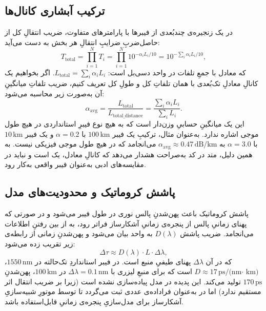 \subsection{ترکیب آبشاری کانال‌ها}

در یک زنجیره‌ی چندبُعدی از فیبرها با پارامترهای متفاوت، ضریب انتقالِ کل از حاصل‌ضربِ ضرایبِ انتقالِ هر بخش به دست می‌آید:
\begin{equation}
	T_{\text{total}} = \prod_{i=1}^{N} T_i = \prod_{i=1}^{N} 10^{-\alpha_i L_i / 10} = 10^{-\sum_i \alpha_i L_i / 10},
	\label{eq:cascade-product}
\end{equation}
که معادل با جمعِ تلفات در واحد دسی‌بل است: $L_{\text{total}} = \sum_i \alpha_i L_i$. اگر بخواهیم یک کانالِ معادلِ تک‌بُعدی با همان تلفاتِ کل و طولِ کل تعریف کنیم، ضریب تلفاتِ میانگینِ آن به‌صورت زیر محاسبه می‌شود:
\begin{equation}
	\alpha_{\text{avg}} = \frac{L_{\text{total}}}{L_{\text{total\_distance}}} = \frac{\sum_i \alpha_i L_i}{\sum_i L_i}.
	\label{eq:cascade-alpha-avg}
\end{equation}
این یک میانگینِ حسابیِ وزن‌دار است که به هیچ نوع فیبرِ استانداردی در هیچ طول موجی اشاره ندارد. به‌عنوان مثال، ترکیبِ یک فیبر $100\,\text{km}$ با $\alpha = 0.2$ و یک فیبر $10\,\text{km}$ با $\alpha = 3.0$ به $\alpha_{\text{avg}} \approx 0.47\,\text{dB/km}$ می‌انجامد که در هیچ طول موجی فیزیکی نیست. به همین دلیل، متد  در کد به‌صراحت هشدار می‌دهد که کانالِ معادل، یک  است و نباید در مقایسه‌های ادبی به‌عنوان فیبر واقعی به‌کار رود.

\subsection{پاشش کروماتیک و محدودیت‌های مدل}

پاشش کروماتیک  باعث پهن‌شدنِ پالس نوری در طول فیبر می‌شود و در صورتی که پهنای زمانیِ پالس از پنجره‌ی زمانیِ آشکارساز فراتر رود، به از بین رفتنِ اطلاعات می‌انجامد. ضریب پاشش $D(\lambda)$ به واحد  بیان می‌شود و پهن‌شدنِ زمانی از رابطه‌ی زیر تقریب زده می‌شود:
\begin{equation}
	\Delta\tau \approx D(\lambda) \cdot L \cdot \Delta\lambda,
	\label{eq:chromatic-dispersion}
\end{equation}
که در آن $\Delta\lambda$ پهنای طیفیِ منبع است. در فیبر استانداردِ تک‌حالته در $1550\,\text{nm}$، $D \approx 17\,\text{ps/(nm· km)}$ است که برای منبعِ لیزری با $\Delta\lambda = 0.1\,\text{nm}$ در $100\,\text{km}$، پهن‌شدنِ $170\,\text{ps}$ تولید می‌کند. این پدیده در مدل  پیاده‌سازی نشده است (زیرا بر ضریب انتقال اثر مستقیم ندارد) اما در  به‌عنوان فراداده‌ی عددی ثبت می‌گردد تا توسط موتورِ شبیه‌سازیِ آشکارساز برای مدل‌سازیِ پنجره‌ی زمانیِ قابل‌استفاده باشد.


